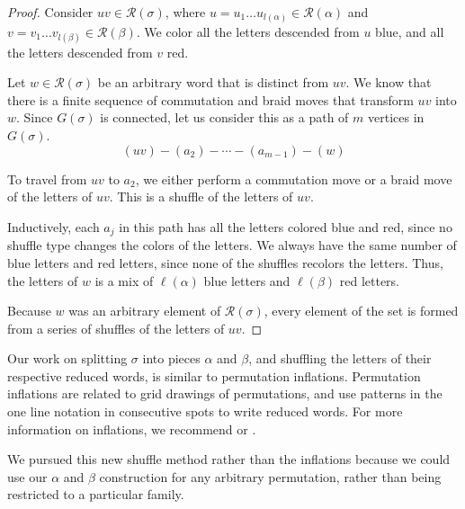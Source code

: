 \documentclass[11pt,reqno]{amsart}
\theoremstyle{definition}
\theoremstyle{notation}
\newcommand{\calR}{\mathcal{R}}
\begin{document}
\begin{proof}
Consider $uv\in \calR(\sigma)$, where $u = u_1\ldots u_{l(\alpha)}\in \calR(\alpha)$ and $v = v_1\ldots v_{l(\beta)}\in \calR(\beta)$. We color all the letters descended from $u$ blue, and all the letters descended from $v$ red. 

Let $w\in \calR(\sigma)$ be an arbitrary word that is distinct from $uv$. We know that there is a finite sequence of commutation and braid moves that transform $uv$ into $w$. Since $G(\sigma)$ is connected, let us consider this as a path of $m$ vertices in $G(\sigma)$.
\[
(uv) - (a_2) - \cdots -(a_{m-1}) - (w)
\]

To travel from $uv$ to $a_2$, we either perform a commutation move or a braid move of the letters of $uv$. This is a shuffle of the letters of $uv$. 

Inductively, each $a_j$ in this path has all the letters colored blue and red, since no shuffle type changes the colors of the letters. We always have the same number of blue letters and red letters, since none of the shuffles recolors the letters. Thus, the letters of $w$ is a mix of $\ell(\alpha)$ blue letters and $\ell(\beta)$ red letters.

Because $w$ was an arbitrary element of $\calR(\sigma)$, every element of the set is formed from a series of shuffles of the letters of $uv$.
\end{proof}

Our work on splitting $\sigma$ into pieces $\alpha$ and $\beta$, and shuffling the letters of their respective reduced words, is similar to permutation inflations. Permutation inflations are related to grid drawings of permutations, and use patterns in the one line notation in consecutive spots to write reduced words. For more information on inflations, we recommend \cite{Alb} or \cite{SDYK}. 

We pursued this new shuffle method rather than the inflations because we could use our $\alpha$ and $\beta$ construction for any arbitrary permutation, rather than being restricted to a particular family. 
\end{document}
